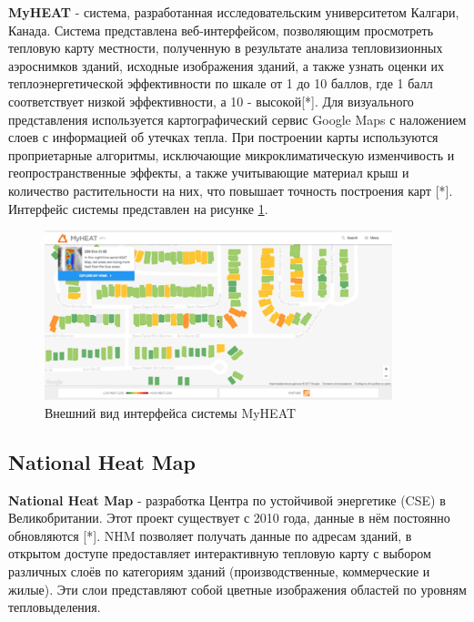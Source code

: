 \par
	\textbf{MyHEAT} - система, разработанная исследовательским университетом Калгари, Канада. Система представлена веб-интерфейсом, позволяющим просмотреть тепловую карту местности, полученную в результате анализа тепловизионных аэроснимков зданий, исходные изображения зданий, а также узнать оценки их теплоэнергетической эффективности по шкале от 1 до 10 баллов, где 1 балл соответствует низкой эффективности, а 10 - высокой[*]. Для визуального представления используется картографический сервис {Google Maps} с наложением слоев с информацией об утечках тепла. При построении карты используются проприетарные алгоритмы, исключающие микроклиматическую изменчивость и геопространственные эффекты, а также учитывающие материал крыш и количество растительности на них, что повышает точность построения карт [*]. Интерфейс системы представлен на рисунке \ref{screens:myheat}.

	\begin{figure}[h!]
      \centering
      \includegraphics[width=0.9\textwidth]{images/screens/0_myheat.png}
      \caption{Внешний вид интерфейса системы MyHEAT}
      \label{screens:myheat}
    \end{figure}

\subsection{National Heat Map}

\par
	\textbf{National Heat Map} - разработка Центра по устойчивой энергетике (CSE) в Великобритании. Этот проект существует с 2010 года, данные в нём постоянно обновляются [*]. NHM позволяет получать данные по адресам зданий, в открытом доступе предоставляет интерактивную тепловую карту с выбором различных слоёв по категориям зданий (производственные, коммерческие и жилые). Эти слои представляют собой цветные изображения областей по уровням тепловыделения.

